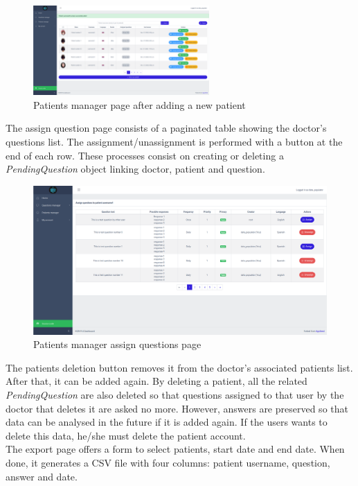 \documentclass[12pt,english]{article}
\begin{document}
\begin{figure}[H]
  \centering
    \includegraphics[width=0.6\textwidth]{added_patient.png}
  \caption{Patients manager page after adding a new patient}
\end{figure}

The assign question page consists of a paginated table showing the doctor's questions list. The assignment/unassignment is performed with a button at the end of each row. These processes consist on creating or deleting a \emph{PendingQuestion} object linking doctor, patient and question.

\begin{figure}[H]
  \centering
    \includegraphics[width=\textwidth]{assign_questions.png}
  \caption{Patients manager assign questions page}
\end{figure}

The patients deletion button removes it from the doctor's associated patients list. After that, it can be added again. By deleting a patient, all the related \emph{PendingQuestion} are also deleted so that questions assigned to that user by the doctor that deletes it are asked no more. However, answers are preserved so that data can be analysed in the future if it is added again. If the users wants to delete this data, he/she must delete the patient account.
\\


The export page offers a form to select patients, start date and end date. When done, it generates a CSV file with four columns: patient username, question, answer and date.
\end{document}
